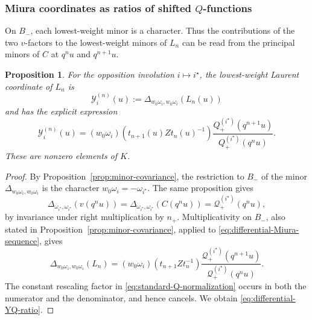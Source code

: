\documentclass[11pt,leqno]{amsart}
\numberwithin{equation}{section}
\theoremstyle{plain}
\newtheorem{proposition}[theorem]{Proposition}
\theoremstyle{definition}
\theoremstyle{plain}
\theoremstyle{definition}
\theoremstyle{remark}
\begin{document}
\subsubsection{Miura coordinates as ratios of shifted \texorpdfstring{$Q$}{Q}-functions}
On $B_-$, each lowest-weight minor is a character. Thus the contributions of the two $v$-factors to the lowest-weight minors of $L_n$ can be read from the principal minors of $C$ at $q^nu$ and $q^{n+1}u$.

\begin{proposition}\label{prop:differential-Miura-YQ}
For the opposition involution $i\mapsto i^\star$, the lowest-weight
Laurent coordinate of $L_n$ is
\begin{equation}\label{eq:differential-YQ-coordinate-realization}
 \mathcal Y_i^{(n)}(u)
   :=\Delta_{w_0\omega_i,w_0\omega_i}(L_n(u))
\end{equation}
and has the explicit expression
\begin{equation}\label{eq:differential-YQ-ratio}
 \mathcal Y_i^{(n)}(u)
  =(w_0\omega_i)\!\left(t_{n+1}(u)Z t_n(u)^{-1}\right)
      \frac{Q_+^{(i^\star)}(q^{n+1}u)}{Q_+^{(i^\star)}(q^nu)}.
\end{equation}
These are nonzero elements of $K$.
\end{proposition}
\begin{proof}
By Proposition~\ref{prop:minor-covariance}, the restriction to $B_-$ of the minor $\Delta_{w_0\omega_i,w_0\omega_i}$ is the character
$w_0\omega_i=-\omega_{i^\star}$.  The same proposition gives
\[
 \Delta_{\omega_{i^\star},\omega_{i^\star}}(v(q^nu))
  =\Delta_{\omega_{i^\star},\omega_{i^\star}}(C(q^nu))
  =\mathcal Q_+^{(i^\star)}(q^nu),
\]
by invariance under right multiplication by $n_+$.  Multiplicativity on $B_-$, also stated in Proposition~\ref{prop:minor-covariance}, applied to
\eqref{eq:differential-Miura-sequence}, gives
\[
 \Delta_{w_0\omega_i,w_0\omega_i}(L_n)
   =(w_0\omega_i)(t_{n+1}Z t_n^{-1})
       \frac{\mathcal Q_+^{(i^\star)}(q^{n+1}u)}
            {\mathcal Q_+^{(i^\star)}(q^nu)}.
\]
The constant rescaling factor in \eqref{eq:standard-Q-normalization} occurs in both the numerator and the denominator, and hence cancels.  We obtain \eqref{eq:differential-YQ-ratio}.
\end{proof}
\end{document}
